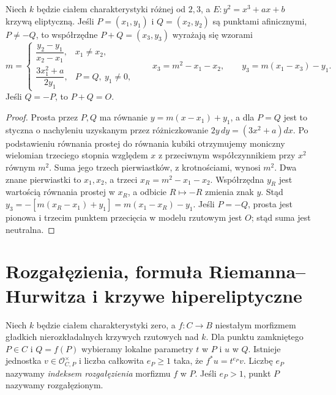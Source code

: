 \begin{stwierdzenie}
Niech $k$ będzie ciałem charakterystyki różnej od $2,3$,
a $E:y^2=x^3+ax+b$ krzywą eliptyczną.
Jeśli $P=(x_1,y_1)$ i $Q=(x_2,y_2)$ są punktami
afinicznymi, $P\ne-Q$, to współrzędne
$P+Q=(x_3,y_3)$ wyrażają się wzorami
\[
 m=\begin{cases}
 \dfrac{y_2-y_1}{x_2-x_1},&x_1\ne x_2,\\[4pt]
 \dfrac{3x_1^2+a}{2y_1},&P=Q,\ y_1\ne0,
 \end{cases}
 \qquad x_3=m^2-x_1-x_2,\qquad
 y_3=m(x_1-x_3)-y_1.
\]
Jeśli $Q=-P$, to $P+Q=O$.
\end{stwierdzenie}
\begin{proof}
Prosta przez $P,Q$ ma równanie
$y=m(x-x_1)+y_1$, a dla $P=Q$ jest to
styczna o nachyleniu uzyskanym przez
różniczkowanie $2y\,dy=(3x^2+a)dx$.
Po podstawieniu równania prostej do równania
kubiki otrzymujemy moniczny wielomian trzeciego
stopnia względem $x$ z przeciwnym współczynnikiem
przy $x^2$ równym $m^2$. Suma jego trzech
pierwiastków, z krotnościami, wynosi $m^2$.
Dwa znane pierwiastki to $x_1,x_2$, a trzeci
$x_R=m^2-x_1-x_2$. Współrzędna $y_R$ jest
wartością równania prostej w $x_R$, a odbicie
$R\mapsto-R$ zmienia znak $y$. Stąd
$y_3=-[m(x_R-x_1)+y_1]=m(x_1-x_R)-y_1$.
Jeśli $P=-Q$, prosta jest pionowa i trzecim
punktem przecięcia w modelu rzutowym jest $O$;
stąd suma jest neutralna.
\end{proof}

\section{Rozgałęzienia, formuła Riemanna--Hurwitza i krzywe hipereliptyczne}
\label{sec:hurwitz}

\begin{definicja}
Niech $k$ będzie ciałem charakterystyki zero, a
$f:C\to B$ niestałym morfizmem gładkich
nierozkładalnych krzywych rzutowych nad $k$.
Dla punktu zamkniętego $P\in C$ i $Q=f(P)$
wybieramy lokalne parametry $t$ w $P$ i $u$ w $Q$. Istnieje
jednostka $v\in\mathcal O_{C,P}^\times$ i
liczba całkowita $e_P\ge1$ taka, że
$f^*u=t^{e_P}v$. Liczbę $e_P$ nazywamy
\emph{indeksem rozgałęzienia} morfizmu $f$ w $P$.
Jeśli $e_P>1$, punkt $P$ nazywamy rozgałęzionym.
\end{definicja}


